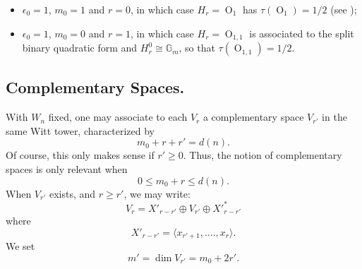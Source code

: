 \documentclass[10pt]{amsart}
\theoremstyle{plain}
\numberwithin{equation}{section}
\begin{document}
 \begin{itemize}
 \item  $\epsilon_0= 1$, $m_0 =1$ and $r=0$, in which case $H_r =
 {\operatorname{O}}_1$ has $\tau({\operatorname{O}}_1) =1/2$  (see \cite{We2});
 \vskip 5pt
 
 \item $\epsilon_0 = 1$, $m_0 = 0$ and $r=1$, in which case $H_r = {\operatorname{O}}_{1,1}$ is associated to the split binary quadratic form and $H_r^0  \cong \mathbb{G}_m$, so that $\tau({\operatorname{O}}_{1,1}) = 1/2$.   
 \end{itemize}
 \vskip 5pt
 
 
\subsection{\bf Complementary Spaces.}
With $W_n$ fixed,  one may associate to each $V_r$  a complementary
space $V_{r'}$ in the same Witt tower, characterized by 
\[  m_0 + r + r'   =   d(n). \]
 Of course, this only makes sense if $r' \geq 0$. Thus, the notion of
 complementary spaces is only relevant when
 \[  0 \leq m_0 +r \leq  d(n). \]
  When $V_{r'}$ exists, and $r \geq r'$, we may write:
  \[  V_r  = X'_{r-r'} \oplus V_{r'} \oplus {X'}^*_{r-r'} \]
  where
  \[  X'_{r-r'} = \langle  x_{r'+1},...., x_r \rangle. \]
We set
\[
m'=\dim V_{r'}=m_0+2r'.
\]
 
\vskip 5pt
 
 
\end{document}
